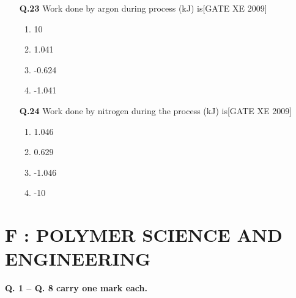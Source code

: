 \documentclass[journal,12pt,onecolumn]{IEEEtran}
\theoremstyle{remark}
\begin{document}
\begin{enumerate}
\item[\textbf{Q.23}]Work done by argon during process (kJ) is\hfill[GATE XE 2009]
\begin{multicols}{2}
\begin{enumerate}
    \item 10
    \item 1.041
    \item -0.624
    \item -1.041
\end{enumerate}
\end{multicols}

\vspace{0.3cm}

\item[\textbf{Q.24}] Work done by nitrogen during the process (kJ) is\hfill[GATE XE 2009]
\begin{multicols}{2}
\begin{enumerate}
    \item 1.046
    \item 0.629
    \item -1.046
    \item -10
\end{enumerate}
\end{multicols}
\end{enumerate}
\section*{F : POLYMER SCIENCE AND ENGINEERING}


\textbf{Q. 1 -- Q. 8 carry one mark each.}

\vspace{0.5em}
\end{document}

